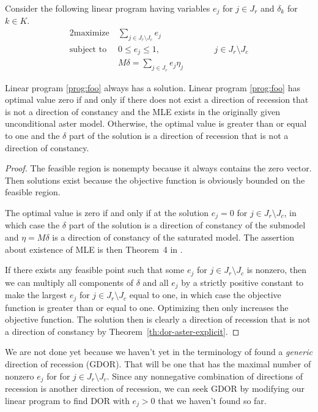 Consider the following linear program having variables $e_j$
for $j \in J_r$ and $\delta_k$ for $k \in K$.
\begin{alignat}{2}
  \text{maximize}   & \ \sum_{j \in J_r \setminus J_c} e_j
  \nonumber
  \\
  \text{subject to} & \ 0 \le e_j \le 1, & \qquad & j \in J_r \setminus J_c
  \label{prog:foo}
  \\
                    & \ M \delta =
  \sum_{j \in J_r} e_j \eta_j
  \nonumber
\end{alignat}
\begin{theorem} \label{th:lin-prog-one}
Linear program \eqref{prog:foo} always has a solution.
Linear program \eqref{prog:foo} has optimal value zero if and only if
there does
not exist a direction of recession that is not a direction of constancy
and the MLE exists in the originally given unconditional aster model.
Otherwise, the optimal value is greater than or equal to one and the
$\delta$ part of the solution is a direction of recession that is not
a direction of constancy.
\end{theorem}
\begin{proof}
The feasible region is nonempty because it always contains the zero vector.
Then solutions exist because the objective function is obviously bounded
on the feasible region.

The optimal value is zero if and only if at the solution $e_j = 0$ for
$j \in J_r \setminus J_c$, in which case the $\delta$ part of the solution
is a direction of constancy of the submodel and $\eta = M \delta$ is a
direction of constancy of the saturated model.  The assertion about
existence of MLE is then Theorem~{4} in \citet{geyer-gdor}.

If there exists any feasible point such that some $e_j$
for $j \in J_r \setminus J_c$ is nonzero, then we can multiply all components
of $\delta$ and all $e_j$ by a strictly positive constant to make
the largest $e_j$ for $j \in J_r \setminus J_c$ equal to one, in which case
the objective function is greater than or equal to one.
Optimizing then only increases the objective function.
The solution then is clearly a direction of recession that is not a
direction of constancy by Theorem~\ref{th:dor-aster-explicit}.
\end{proof}

We are not done yet because we haven't yet in the terminology of
\citet{geyer-gdor} found a \emph{generic} direction of recession (GDOR).
That will be one that has the maximal number of nonzero $e_j$ for
for $j \in J_r \setminus J_c$.  Since any nonnegative combination of
directions of recession is another direction of recession, we can
seek GDOR by modifying our linear program to find DOR with $e_j > 0$
that we haven't found so far.

